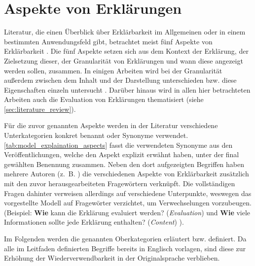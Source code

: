 \section{Aspekte von Erklärungen}
\label{sec:model_explanation_aspects}

Literatur, die einen Überblick über Erklärbarkeit im Allgemeinen oder in einem bestimmten Anwendungsfeld gibt, betrachtet meist fünf Aspekte von Erklärbarkeit \cite{rosenfeld_explainability_2019, nunes_systematic_2017,chazette_knowledge_nodate}. Die fünf Aspekte setzen sich aus dem Kontext der Erklärung, der Zielsetzung dieser, der Granularität von Erklärungen und wann diese angezeigt werden sollen, zusammen. In einigen Arbeiten wird bei der Granularität außerdem zwischen dem Inhalt und der Darstellung unterschieden bzw. diese Eigenschaften einzeln untersucht \cite{nunes_systematic_2017,abdulrahman_belief-based_2019}. Darüber hinaus wird in allen hier betrachteten Arbeiten auch die Evaluation von Erklärungen thematisiert (siehe \autoref{sec:literature_review}).

Für die zuvor genannten Aspekte werden in der Literatur verschiedene Unterkategorien konkret benannt oder Synonyme verwendet. \autoref{tab:model_explaination_aspects} fasst die verwendeten Synonyme aus den Veröffentlichungen, welche den Aspekt explizit erwähnt haben, unter der final gewählten Benennung zusammen. Neben den dort aufgezeigten Begriffen haben mehrere Autoren (z.~B. \cite{rosenfeld_explainability_2019, chazette2020explainability}) die verschiedenen Aspekte von Erklärbarkeit zusätzlich mit den zuvor herausgearbeiteten Fragewörtern verknüpft. Die vollständigen Fragen dahinter verweisen allerdings auf verschiedene Unterpunkte, weswegen das vorgestellte Modell auf Fragewörter verzichtet, um Verwechselungen vorzubeugen. (Beispiel: \glqq \textbf{Wie} kann die Erklärung evaluiert werden?\grqq{} (\textit{Evaluation}) \cite[vgl.][]{rosenfeld_explainability_2019} und \glqq \textbf{Wie} viele Informationen sollte jede Erklärung enthalten?\grqq{} (\textit{Content}) \cite[vgl.][]{kouki_user_2017}).

\bigskip

Im Folgenden werden die genannten Oberkategorien erläutert bzw. definiert. Da alle im Leitfaden definierten Begriffe bereits in Englisch vorlagen, sind diese zur Erhöhung der Wiederverwendbarkeit in der Originalsprache verblieben. 

